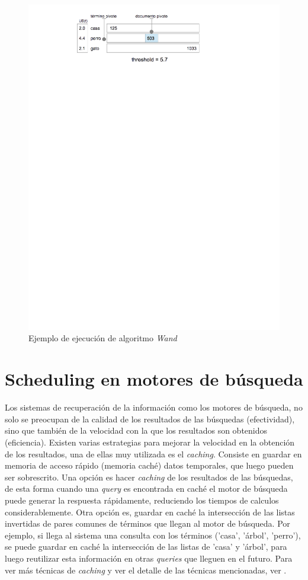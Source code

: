 \begin{figure}[H]
\centering
\includegraphics[scale=.75]{images/proceso_wand.png}
\caption{Ejemplo de ejecución de algoritmo  \textit{Wand}}
\label{fig:proceso_wand}
\end{figure}


\section{Scheduling en motores de búsqueda}
\label{marco:scheduling}
Los sistemas de recuperación de la información como los motores de búsqueda, no solo se preocupan de la calidad de los resultados de las búsquedas (efectividad), sino que también de la velocidad con la que los resultados son obtenidos (eficiencia). Existen varias estrategias para mejorar la velocidad en la obtención de los resultados, una de ellas muy utilizada es el \textit{caching}. Consiste en guardar en memoria de acceso rápido (memoria caché) datos temporales, que luego pueden ser sobrescrito. Una opción es hacer \textit{caching} de los resultados de las búsquedas, de esta forma cuando una \textit{query} es encontrada en caché el motor de búsqueda puede generar la respuesta rápidamente, reduciendo los tiempos de calculos considerablemente. Otra opción es, guardar en caché la intersección de las listas invertidas de pares comunes de términos que llegan al motor de búsqueda. Por ejemplo, si llega al sistema una consulta con los términos ('casa', 'árbol', 'perro'), se puede guardar en caché la intersección de las listas de 'casa' y 'árbol', para luego reutilizar esta información en otras \textit{queries} que lleguen en el futuro. Para ver más técnicas de \textit{caching} y ver el detalle de las técnicas mencionadas, ver \citep{Buttcher:2010}.

